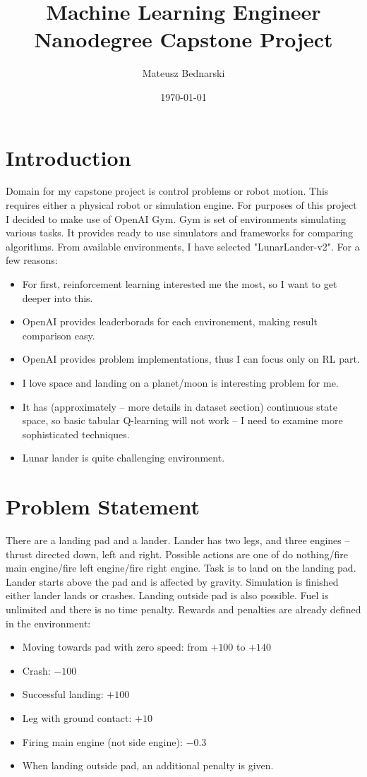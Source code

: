 \documentclass[12pt]{article}
\title{Machine Learning Engineer Nanodegree Capstone Project}
\author{Mateusz Bednarski}
\date{\today}
\begin{document}
\maketitle



\section{Introduction}

Domain for my capstone project is control problems or robot motion. This requires either a physical robot or simulation engine. For purposes of this project I decided to make use of OpenAI Gym\cite{GYM}. Gym is set of environments simulating various tasks. It provides ready to use simulators and frameworks for comparing algorithms. From available environments, I have selected "LunarLander-v2"\cite{lunarlander}. For a few reasons:
\begin{itemize}
\item For first, reinforcement learning interested me the most, so I want to get deeper into this.
\item OpenAI provides leaderborads for each environement, making result comparison easy.
\item OpenAI provides problem implementations, thus I can focus only on RL part.
\item I love space and landing on a planet/moon is interesting problem for me.
\item It has (approximately – more details in dataset section) continuous state space, so basic tabular Q-learning will not work – I need to examine more sophisticated techniques.
\item Lunar lander is quite challenging environment.
\end{itemize}

\section{Problem Statement}



There are a landing pad and a lander. Lander has two legs, and three engines – thrust directed down, left and right. Possible actions are one of do nothing/fire main engine/fire left engine/fire right engine.  Task is to land on the landing pad.  Lander starts above the pad and is affected by gravity. Simulation is finished either lander lands or crashes. Landing outside pad is also possible. Fuel is unlimited and there is no time penalty.
Rewards and penalties are already defined in the environment:
\begin{itemize}
\item Moving towards pad with zero speed: from $+100$ to $+140$
\item Crash: $-100$
\item Successful landing: $+100$
\item Leg with ground contact: $+10$
\item Firing main engine (not side engine): $-0.3$
\item When landing outside pad, an additional penalty is given.
\end{itemize}
\end{document}
